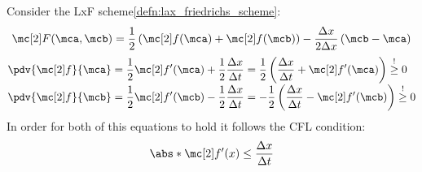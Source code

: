 \begin{examplebox}\nospacing
    \begin{example}\label{example:lxf_monotonicity}
        Consider the LxF scheme\cref{defn:lax_friedrichs_scheme}:
        \begin{align*}
          \Flux(\mca,\mcb)=\frac{1}{2}\left(\flux(\mca)+\flux(\mcb)\right)-\frac{\Delta x}{2\Delta x} \left(\mcb-\mca\right)
        \end{align*}
        \begin{align*}
          &\pdv{\flux}{\mca}=\frac{1}{2}\flux'(\mca)+\frac{1}{2}\frac{\Delta x}{\Delta t}=\frac{1}{2} \left(\frac{\Delta x}{\Delta t}+\flux'(\mca)\right)\stackrel{!}{\geq}0 \\[-1\jot]
          &\pdv{\flux}{\mcb}=\frac{1}{2}\flux'(\mcb)-\frac{1}{2}\frac{\Delta x}{\Delta t}=-\frac{1}{2} \left(\frac{\Delta x}{\Delta t}-\flux'(\mcb)\right)\stackrel{!}{\geq}0
        \end{align*}
        In order for both of this equations to hold it follows the CFL condition:
        \begin{align*}
          \abs*{\flux'(x)}\leq\frac{\Delta x}{\Delta t}
        \end{align*}
    \end{example}
\end{examplebox}
